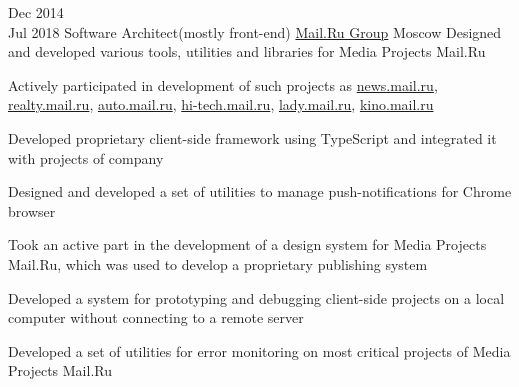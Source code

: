 \documentclass[11pt,a4paper,sans]{moderncv}
\newcommand{\lang}[2]{#2}
\begin{document}
	\cventry
	{\lang{Дек}{Dec} 2014\\\lang{Июл}{Jul} 2018}
	{\lang
		{Архитектор программного обеспечения}
		{Software Architect(mostly front-end)}}
	{\href{https://corp.mail.ru}{Mail.Ru Group}}
	{\lang
		{Москва}
		{Moscow}}
	{}
	{\lang
		{Занимался проектированием и разработкой инструментов, утилит и библиотек в медиапроектах Mail.Ru.}
		{Designed and developed various tools, utilities and libraries for Media Projects Mail.Ru}}
					
	\cvlistitem
	{\lang
		{Принимал участие в разработке проектов \href{https://news.mail.ru}{news.mail.ru}, \href{https://realty.mail.ru}{realty.mail.ru}, \href{https://auto.mail.ru}{auto.mail.ru}, \href{https://hi-tech.mail.ru}{hi-tech.mail.ru}, \href{https://lady.mail.ru}{lady.mail.ru}, \href{https://kino.mail.ru}{kino.mail.ru}}
		{Actively participated in development of such projects as \href{https://news.mail.ru}{news.mail.ru}, \href{https://realty.mail.ru}{realty.mail.ru}, \href{https://auto.mail.ru}{auto.mail.ru}, \href{https://hi-tech.mail.ru}{hi-tech.mail.ru}, \href{https://lady.mail.ru}{lady.mail.ru}, \href{https://kino.mail.ru}{kino.mail.ru}}}
					
	\cvlistitem
	{\lang
		{Разработал фреймворк для создания клиентских приложений с использованием языка TypeScript}
		{Developed proprietary client-side framework using TypeScript and integrated it with projects of company}}
					
	\cvlistitem
	{\lang
		{Разработал и внедрил набор утилит для управления push-уведомлениями для браузера Chrome}
		{Designed and developed a set of utilities to manage push-notifications for Chrome browser}}
					
	\cvlistitem
	{\lang
		{Принимал участие в разработке дизайн-системы для медийных проектов mail.ru, на основе которой была создана система для разработки новых проектов компании}
		{Took an active part in the development of a design system for Media Projects Mail.Ru, which was used to develop a proprietary publishing system}}
					
					
	\cvlistitem
	{\lang
		{Разработал систему прототипирования и отладки клиентской части проектов на локальном компьютере без подключения к удаленному серверу}
		{Developed a system for prototyping and debugging client-side projects on a local computer without connecting to a remote server}}
					
	\cvlistitem
	{\lang
		{Разработал и внедрил систему мониторинга критических ошибок на высоконагруженных проектах компании}
		{Developed a set of utilities for error monitoring on most critical projects of Media Projects Mail.Ru}\\}
										
\end{document}

